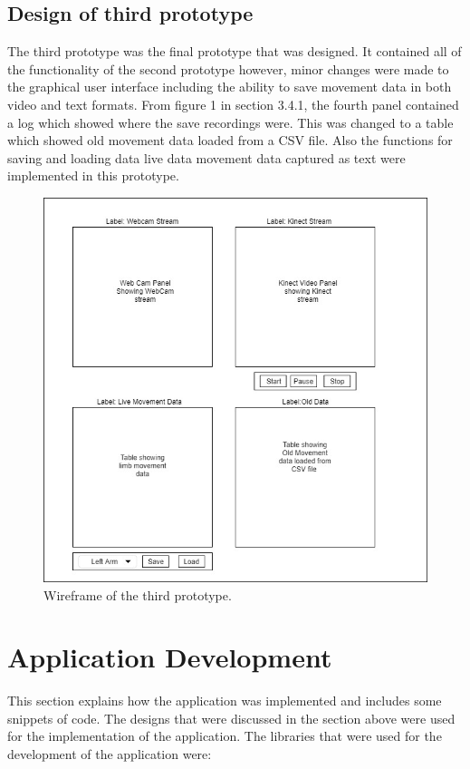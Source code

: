 \documentclass[a4paper, 12pt]{article}
\begin{document}
\subsection{Design of third prototype}

The third prototype was the final prototype that was designed. It contained all of the functionality of the second prototype however, minor changes were made to the graphical user interface including the ability to save movement data in both video and text formats. From figure 1 in section 3.4.1, the fourth panel contained a log which showed where the save recordings were. This was changed to a table which showed old movement data loaded from a CSV file. Also the functions for saving and loading data live data movement data captured as text were implemented in this prototype.

\begin{figure}[!htb]
	\begin{center}
  \includegraphics[scale=0.7]{3PrototypeUI.jpg}
  	\caption{Wireframe of the third prototype.}
  \end{center} 
  \label{fig: 3rdPrototype} 
\end{figure}

\clearpage
\newpage 

\section{Application Development}
This section explains how the application was implemented and includes some snippets of code. The designs that were discussed in the section above were used for the implementation of the application. The libraries that were used for the development of the application were: 
\end{document}
